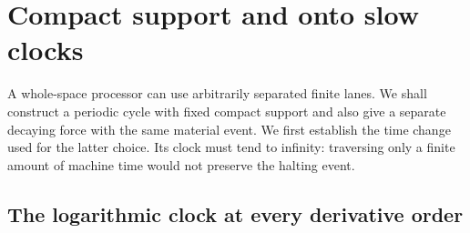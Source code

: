 \section{Compact support and onto slow clocks}\label{ba:euclidean}

A whole-space processor can use arbitrarily separated finite lanes.
We shall construct a periodic cycle with fixed compact support and also
give a separate decaying force with the same material event. We first
establish the time change used for the latter choice. Its clock must tend
to infinity: traversing only a finite amount of machine time would not
preserve the halting event.

\subsection{The logarithmic clock at every derivative order}

